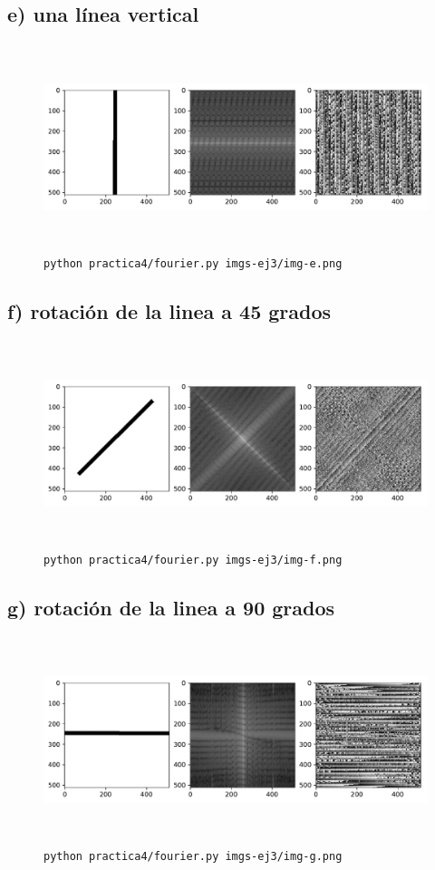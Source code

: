 \documentclass[11pt, spanish]{article}
\begin{document}
\subsection{e) una línea vertical}
\begin{figure}[H]
\centering
  \includegraphics[height=6cm]{informe-imgs/ej3-e.pdf}
  \caption{\texttt{python practica4/fourier.py imgs-ej3/img-e.png}}
\end{figure}

\subsection{f) rotación de la linea a 45 grados}
\begin{figure}[H]
\centering
  \includegraphics[height=6cm]{informe-imgs/ej3-f.pdf}
  \caption{\texttt{python practica4/fourier.py imgs-ej3/img-f.png}}
\end{figure}

\subsection{g) rotación de la linea a 90 grados}
\begin{figure}[H]
\centering
  \includegraphics[height=6cm]{informe-imgs/ej3-g.pdf}
  \caption{\texttt{python practica4/fourier.py imgs-ej3/img-g.png}}
\end{figure}
\end{document}
